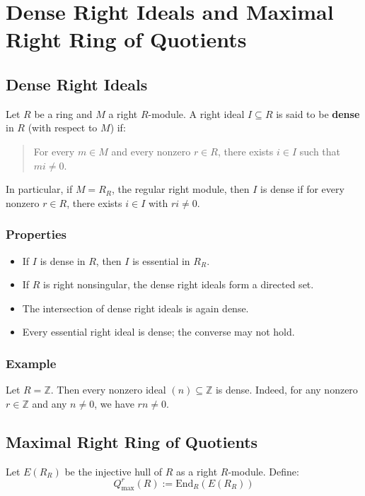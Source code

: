 \documentclass{article}
\begin{document}
	
	\section*{Dense Right Ideals and Maximal Right Ring of Quotients}
	
	\subsection*{Dense Right Ideals}
	Let $R$ be a ring and $M$ a right $R$-module. A right ideal $I \subseteq R$ is said to be \textbf{dense} in $R$ (with respect to $M$) if:
	
	\begin{quote}
		For every $m \in M$ and every nonzero $r \in R$, there exists $i \in I$ such that $mi \ne 0$.
	\end{quote}
	
	In particular, if $M = R_R$, the regular right module, then $I$ is dense if for every nonzero $r \in R$, there exists $i \in I$ with $ri \ne 0$.
	
	\subsubsection*{Properties}
	\begin{itemize}
		\item If $I$ is dense in $R$, then $I$ is essential in $R_R$.
		\item If $R$ is right nonsingular, the dense right ideals form a directed set.
		\item The intersection of dense right ideals is again dense.
		\item Every essential right ideal is dense; the converse may not hold.
	\end{itemize}
	
	\subsubsection*{Example}
	Let $R = \mathbb{Z}$. Then every nonzero ideal $(n) \subseteq \mathbb{Z}$ is dense. Indeed, for any nonzero $r \in \mathbb{Z}$ and any $n \ne 0$, we have $rn \ne 0$.
	
	\subsection*{Maximal Right Ring of Quotients}
	
	Let $E(R_R)$ be the injective hull of $R$ as a right $R$-module. Define:
	\[
	Q^r_{\text{max}}(R) := \text{End}_R(E(R_R))
	\]
	
\end{document}
